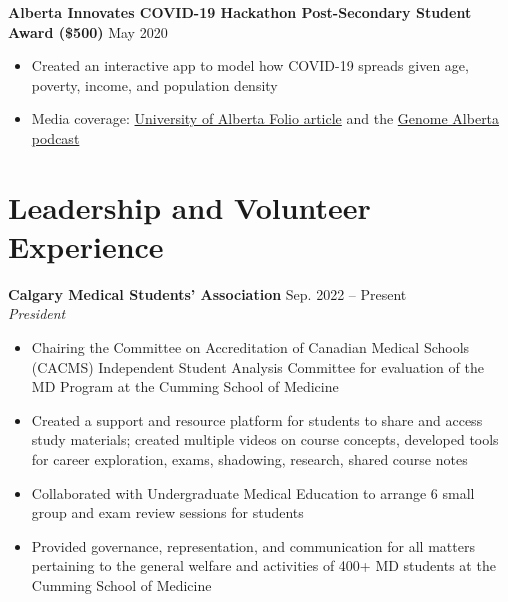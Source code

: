 \documentclass{article}
\begin{document}
\textbf{Alberta Innovates COVID-19 Hackathon Post-Secondary Student Award (\$500)} \hfill May 2020
\begin{itemize}
    \item Created an interactive app to model how COVID-19 spreads given age, poverty, income, and population density
    \item Media coverage: \href{https://www.folio.ca/students-develop-online-tool-to-predict-covid-19-spread-based-on-demographics/}{University of Alberta Folio article} and the \href{https://genomealberta.ca/genomics/genomics_blog_08182001.aspx}{Genome Alberta podcast}
\end{itemize}


\section*{\textcolor{my_colour}{Leadership and Volunteer Experience}}
\vspace{-.25em} \hrulefill \vspace{.25em}

\textbf{Calgary Medical Students' Association} \hfill Sep. 2022 -- Present \\
\textit{President}
\begin{itemize}
    \item Chairing the Committee on Accreditation of Canadian Medical Schools (CACMS) Independent Student Analysis Committee for evaluation of the MD Program at the Cumming School of Medicine
    \item Created a support and resource platform for students to share and access study materials; created multiple videos on course concepts, developed tools for career exploration, exams, shadowing, research, shared course notes
    \item Collaborated with Undergraduate Medical Education to arrange 6 small group and exam review sessions for students
    \item Provided  governance, representation, and communication for all matters pertaining to the general welfare and activities of 400+ MD students at the Cumming School of Medicine
\end{itemize} \vspace{1em}
\end{document}
